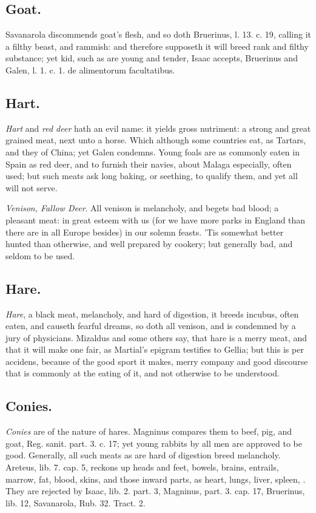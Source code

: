 {{\subsection{Goat.}
Savanarola discommends goat's flesh, and so doth
Bruerinus, l. 13. c. 19, calling it a filthy beast, and rammish:
and therefore supposeth it will breed rank and filthy substance; yet
kid, such as are young and tender, Isaac accepts, Bruerinus and Galen,
l. 1. c. 1. de alimentorum facultatibus.
\subsection{Hart.}
\emph{Hart} and \emph{red deer} hath an evil name: it yields gross
nutriment: a strong and great grained meat, next unto a horse. Which
although some countries eat, as Tartars, and they of China; yet 
Galen condemns. Young foals are as commonly eaten in Spain as red deer,
and to furnish their navies, about Malaga especially, often used; but
such meats ask long baking, or seething, to qualify them, and yet all
will not serve.

\emph{Venison, Fallow Deer}. All venison is melancholy, and begets bad blood;
a pleasant meat: in great esteem with us (for we have more parks in
England than there are in all Europe besides) in our solemn feasts.
'Tis somewhat better hunted than otherwise, and well prepared by
cookery; but generally bad, and seldom to be used.
\subsection{Hare.}
\emph{Hare}, a black meat, melancholy, and hard of digestion, it
breeds incubus, often eaten, and causeth fearful dreams, so doth all
venison, and is condemned by a jury of physicians. Mizaldus and some
others say, that hare is a merry meat, and that it will make one fair,
as Martial's epigram testifies to Gellia; but this is per accidens,
because of the good sport it makes, merry company and good discourse
that is commonly at the eating of it, and not otherwise to be
understood.

\subsection{Conies.}
\emph{Conies} are of the nature of hares. Magninus compares
them to beef, pig, and goat, Reg. sanit. part. 3. c. 17; yet young
rabbits by all men are approved to be good.
Generally, all such meats as are hard of digestion breed melancholy.
Areteus, lib. 7. cap. 5, reckons up heads and feet, bowels,
brains, entrails, marrow, fat, blood, skins, and those inward parts, as
heart, lungs, liver, spleen, \etc{}. They are rejected by Isaac, lib. 2.
part. 3, Magninus, part. 3. cap. 17, Bruerinus, lib. 12, Savanarola,
Rub. 32. Tract. 2.

}}
